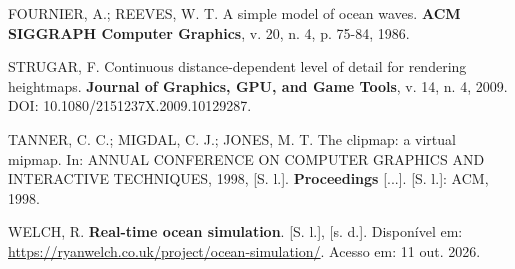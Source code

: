\documentclass[conference]{IEEEtran}
\begin{document}
FOURNIER, A.; REEVES, W. T. A simple model of ocean waves. \textbf{ACM
SIGGRAPH Computer Graphics}, v. 20, n. 4, p. 75-84, 1986.

STRUGAR, F. Continuous distance-dependent level of detail for rendering
heightmaps. \textbf{Journal of Graphics, GPU, and Game Tools}, v. 14, n. 4,
2009. DOI: 10.1080/2151237X.2009.10129287.

TANNER, C. C.; MIGDAL, C. J.; JONES, M. T. The clipmap: a virtual mipmap.
In: ANNUAL CONFERENCE ON COMPUTER GRAPHICS AND INTERACTIVE TECHNIQUES,
1998, [S. l.]. \textbf{Proceedings} [...]. [S. l.]: ACM, 1998.

WELCH, R. \textbf{Real-time ocean simulation}. [S. l.], [s. d.].
Disponível em: \url{https://ryanwelch.co.uk/project/ocean-simulation/}.
Acesso em: 11 out. 2026.
\endgroup
\end{document}
